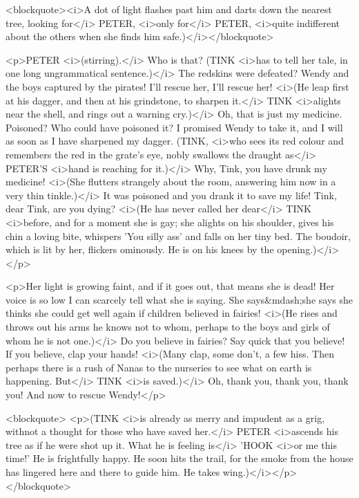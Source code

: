 <blockquote><i>A dot of light flashes past him and darts down the
nearest tree, looking for</i> PETER, <i>only for</i> PETER, <i>quite
indifferent about the others when she finds him
safe.)</i></blockquote>

<p>PETER <i>(stirring).</i> Who is that? (TINK <i>has to tell her
tale, in one long ungrammatical sentence.)</i> The redskins were
defeated? Wendy and the boys captured by the pirates! I'll rescue
her, I'll rescue her! <i>(He leap first at his dagger, and then at
his grindstone, to sharpen it.</i> TINK <i>alights near the shell,
and rings out a warning cry.)</i> Oh, that is just my medicine.
Poisoned? Who could have poisoned it? I promised Wendy to take it,
and I will as soon as I have sharpened my dagger. (TINK, <i>who sees
its red colour and remembers the red in the grate's eye, nobly
swallows the draught as</i> PETER'S <i>hand is reaching for it.)</i>
Why, Tink, you have drunk my medicine! <i>(She flutters strangely
about the room, answering him now in a very thin tinkle.)</i> It was
poisoned and you drank it to save my life! Tink, dear Tink, are you
dying? <i>(He has never called her dear</i> TINK <i>before, and for a
moment she is gay; she alights on his shoulder, gives his chin a
loving bite, whispers 'You silly ass' and falls on her tiny bed. The
boudoir, which is lit by her, flickers ominously. He is on his knees
by the opening.)</i></p>

<p>Her light is growing faint, and if it goes out, that means she is
dead! Her voice is so low I can scarcely tell what she is saying. She
says&mdash;she says she thinks she could get well again if children
believed in fairies! <i>(He rises and throws out his arms he knows
not to whom, perhaps to the boys and girls of whom he is not
one.)</i> Do you believe in fairies? Say quick that you believe! If
you believe, clap your hands! <i>(Many clap, some don't, a few hiss.
Then perhaps there is a rush of Nanas to the nurseries to see what on
earth is happening. But</i> TINK <i>is saved.)</i> Oh, thank you,
thank you, thank you! And now to rescue Wendy!</p>

<blockquote>
<p>(TINK <i>is already as merry and impudent as a grig, withnot a
thought for those who have saved her.</i> PETER <i>ascends his tree
as if he were shot up it. What he is feeling is</i> 'HOOK <i>or me
this time!' He is frightfully happy. He soon hits the trail, for the
smoke from the house has lingered here and there to guide him. He
takes wing.)</i></p>
</blockquote>
